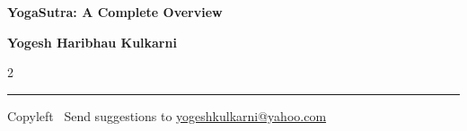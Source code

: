 \documentclass[9pt,a4paper,landscape]{article}
\begin{document}
\footnotesize

\begin{center}
\Large{\textbf{YogaSutra: A Complete Overview}}

\small{\textbf{Yogesh Haribhau Kulkarni}}
\end{center}

\begin{multicols}{2}

\end{multicols}

\rule{\linewidth}{0.25pt}
\scriptsize
Copyleft \textcopyleft\  Send suggestions to
\href{http://www.yogeshkulkarni.com}{yogeshkulkarni@yahoo.com}
\end{document}
